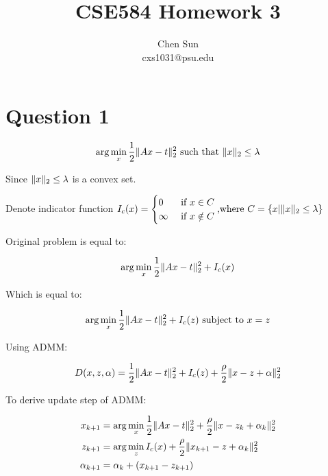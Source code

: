 \documentclass{amsart}
\DeclarePairedDelimiter\norm{\lVert}{\rVert}%
\begin{document}
\title{CSE584 Homework 3}
\author{Chen Sun\\cxs1031@psu.edu}
\maketitle


\section{Question 1}

\begin{align*}
	\arg \min\limits_{x} \frac{1}{2} \norm{Ax-t}_2^2 \text{ such that } \norm{x}_2 \le \lambda
\end{align*}

Since $\norm{x}_2 \le \lambda$ is a convex set.

Denote indicator function $I_c(x) = \begin{cases}
0 & \text{ if } x \in C\\
\infty & \text{ if } x \notin C

\end{cases}\text{,where } C=\{x|\norm{x}_2 \le \lambda\}$ 

Original problem is equal to:

\begin{align*}
		\arg \min\limits_{x} \frac{1}{2} \norm{Ax-t}_2^2 + I_c(x)
\end{align*} 

Which is equal to:

\begin{align*}
	\arg \min\limits_{x} \frac{1}{2} \norm{Ax-t}_2^2 + I_c(z)\text{ subject to } x = z
\end{align*} 

Using ADMM:

\begin{align*}
D(x,z,\alpha) = \frac{1}{2} \norm{Ax-t}_2^2 + I_c(z) + \frac{\rho}{2}\norm{x-z+\alpha}_2^2
\end{align*} 

To derive update step of ADMM:

\begin{align*}
x_{k+1} &= \arg \min\limits_{x} \frac{1}{2} \norm{Ax-t}_2^2 + \frac{\rho}{2}\norm{x-z_k+\alpha_k}_2^2\\
z_{k+1} &= \arg \min\limits_{z} I_c(x) + \frac{\rho}{2}\norm{x_{k+1}-z+\alpha_k}_2^2\\
\alpha_{k+1} &= \alpha_k + (x_{k+1} - z_{k+1})
\end{align*} 
\end{document}
